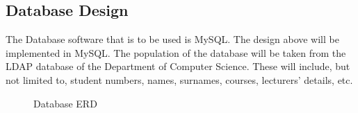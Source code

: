 \documentclass[12pt]{article}
\begin{document}
	\vspace{0.5cm}
	\subsection{Database Design}
	
	\vspace{0.5cm}
	
		The Database software that is to be used is MySQL. The design above will be implemented in MySQL. The population of the database will be taken from the LDAP database of the Department of Computer Science. These will include, but not limited to, student numbers, names, surnames, courses, lecturers’ details, etc. 
		
		\begin{figure}[htbp]
			\centering
			\caption{Database ERD}
		\end{figure}
		
		\vspace{1.5cm}
		
\end{document}
